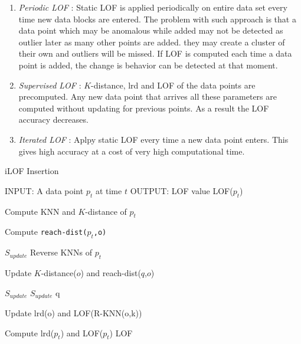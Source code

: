 	\begin{enumerate}
		\item \textit{Periodic LOF} : Static LOF is applied periodically on entire data set every time new data blocks are entered. The problem with such approach is that a data point which may be anomalous while added may not be detected as outlier later as many other points are added. they may create a cluster of their own and outliers will be missed. If LOF is computed each time a data point is added, the change is behavior can be detected at that moment.
		
		\item \textit{Supervised LOF} : $K$-distance, lrd and LOF of the data points are precomputed. Any new data point that arrives all these parameters are computed without updating for previous points. As a result the LOF accuracy decreases. 
		
		\item \textit{Iterated LOF} : Aplpy static LOF every time a new data point enters. This gives high accuracy at a cost of very high computational time. 
		
		
	\end{enumerate} 
	

	\begin{algorithm}[H]
		\caption{iLOF Insertion}
		\begin{algorithmic}
			\STATE  
			\STATE INPUT:  A data point $p_t$ at time $t$
			\STATE OUTPUT: LOF value LOF($p_t$)
			\STATE
			
			\STATE Compute KNN and $K$-distance of $p_t$
			
			
			\STATE Compute \texttt{reach-dist($p_t$,o)}
			
			\ENDFOR
			
			\STATE  $S_{update}$ \leftarrow Reverse KNNs of $p_t$
			
			
			\STATE Update $K$-distance($o$) and reach-dist($q$,$o$)
			
			
			\STATE $S_{update}$ \leftarrow  $S_{update}$ \cup q
			\ENDIF
			
			\ENDFOR
			
			
			\STATE Update lrd(o) and LOF(R-KNN(o,k))
			
			\ENDFOR
			\STATE Compute lrd($p_t$) and LOF($p_t$)
			\RETURN LOF
			
			
		\end{algorithmic}
	\end{algorithm}

